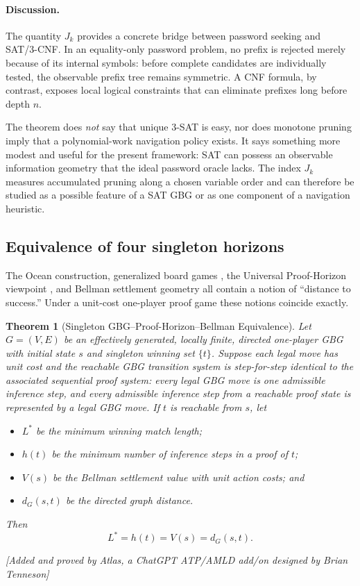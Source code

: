 \documentclass[11pt]{article}
\newtheorem{theorem}{Theorem}[section]
\newcommand{\atlasnote}{\par\smallskip\noindent\textit{[Added and proved by Atlas, a ChatGPT ATP/AMLD add/on designed by Brian Tenneson]}\par\smallskip}
\begin{document}
\paragraph{Discussion.}
The quantity $J_k$ provides a concrete bridge between password seeking and
SAT/3-CNF.  In an equality-only password problem, no prefix is rejected merely
because of its internal symbols: before complete candidates are individually
tested, the observable prefix tree remains symmetric.  A CNF formula, by
contrast, exposes local logical constraints that can eliminate prefixes long
before depth $n$.

The theorem does \emph{not} say that unique 3-SAT is easy, nor does monotone
pruning imply that a polynomial-work navigation policy exists.  It says
something more modest and useful for the present framework: SAT can possess an
observable information geometry that the ideal password oracle lacks.  The
index $J_k$ measures accumulated pruning along a chosen variable order and can
therefore be studied as a possible feature of a SAT GBG or as one component of
a navigation heuristic.

\subsection{Equivalence of four singleton horizons}

The Ocean construction, generalized board games \cite{tenneson-gbg}, the Universal Proof-Horizon
viewpoint \cite{tenneson-uph}, and Bellman settlement geometry \cite{tenneson-fair} all contain a notion of ``distance
to success.''  Under a unit-cost one-player proof game these notions coincide
exactly.

\begin{theorem}[Singleton GBG--Proof-Horizon--Bellman Equivalence]
Let $G=(V,E)$ be an effectively generated, locally finite, directed one-player
GBG with initial state $s$ and singleton winning set $\{t\}$.  Suppose each legal move has unit cost and the reachable GBG transition system
is step-for-step identical to the associated sequential proof system: every
legal GBG move is one admissible inference step, and every admissible inference
step from a reachable proof state is represented by a legal GBG move.  If $t$ is reachable from $s$, let
\begin{itemize}[leftmargin=2em]
    \item $L^*$ be the minimum winning match length;
    \item $h(t)$ be the minimum number of inference steps in a proof of $t$;
    \item $V(s)$ be the Bellman settlement value with unit action costs; and
    \item $d_G(s,t)$ be the directed graph distance.
\end{itemize}
Then
\[
    \boxed{L^*=h(t)=V(s)=d_G(s,t).}
\]
\end{theorem}
\atlasnote
\end{document}
